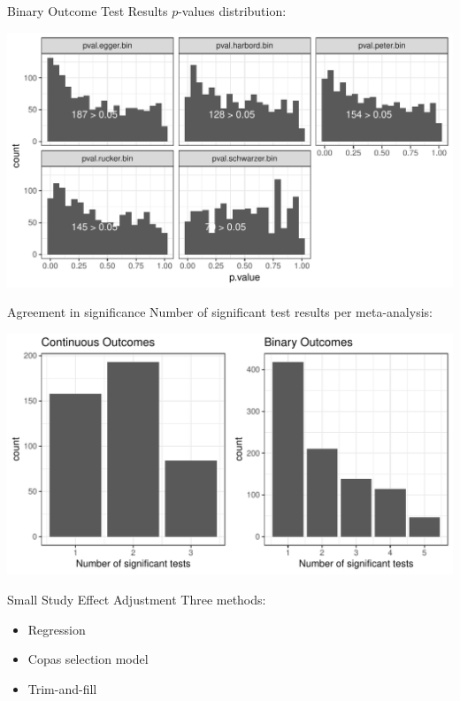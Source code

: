 \documentclass[english]{beamer}\usepackage[]{graphicx}\usepackage[]{color}
\makeatletter
\def\maxwidth{ %
  \ifdim\Gin@nat@width>\linewidth
    \linewidth
  \else
    \Gin@nat@width
  \fi
}
\newenvironment{knitrout}{}{} %
\makeatother
\begin{document}
\begin{frame}[fragile]{Binary Outcome Test Results}
$p$-values distribution:

\begin{knitrout}
\color{fgcolor}
\includegraphics[width=\maxwidth]{figure/unnamed-chunk-11-1} 

\end{knitrout}
\end{frame}

\begin{frame}[fragile]{Agreement in significance}
Number of significant test results per meta-analysis:

\begin{knitrout}
\color{fgcolor}
\includegraphics[width=\maxwidth]{figure/unnamed-chunk-12-1} 

\end{knitrout}
\end{frame}

\begin{frame}{Small Study Effect Adjustment}
Three methods:
\begin{itemize}
\item Regression
\item Copas selection model
\item Trim-and-fill
\end{itemize}
\end{frame}
\end{document}
